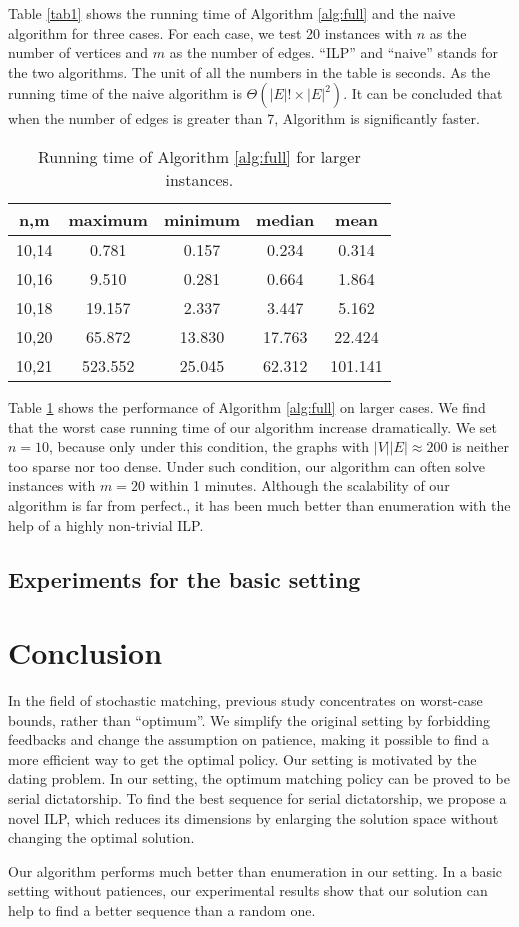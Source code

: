 \documentclass[letterpaper]{article}
\begin{document}
Table \ref{tab1} shows the running time of Algorithm \ref{alg:full} and the naive algorithm for three cases.
For each case, we test 20 instances with $n$ as the number of vertices and $m$ as the number of edges.
``ILP'' and ``naive'' stands for the two algorithms.
The unit of all the numbers in the table is seconds.
As the running time of the naive algorithm is $\Theta(|E|!\times |E|^2)$.
It can be concluded that when the number of edges is greater than 7, Algorithm is significantly faster.

\begin{table}
	\caption{Running time of Algorithm \ref{alg:full} for larger instances.}
	\label{tab2}
	\begin{tabular}{ccccc}
		\hline
		n,m & maximum & minimum & median & mean\\ \hline
		10,14 & 0.781&0.157&0.234&0.314\\
		10,16 & 9.510&0.281&0.664&1.864\\
		10,18 & 19.157&2.337&3.447&5.162\\
		10,20 & 65.872&13.830&17.763&22.424\\
		10,21 & 523.552&25.045&62.312&101.141\\ \hline
	\end{tabular}
\end{table}

Table \ref{tab2} shows the performance of Algorithm \ref{alg:full} on larger cases.
We find that the worst case running time of our algorithm increase dramatically.
We set $n=10$, because only under this condition, the graphs with $|V||E|\approx200$ is neither too sparse nor too dense.
Under such condition, our algorithm can often solve instances with $m=20$ within 1 minutes.
Although the scalability of our algorithm is far from perfect., it has been much better than enumeration with the help of a highly non-trivial ILP.

\subsection{Experiments for the basic setting}

\section{Conclusion}
In the field of stochastic matching, previous study concentrates on worst-case bounds, rather than ``optimum''.
We simplify the original setting by forbidding feedbacks and change the assumption on patience, making it possible to find a more efficient way to get the optimal policy.
Our setting is motivated by the dating problem.
In our setting, the optimum matching policy can be proved to be serial dictatorship.
To find the best sequence for serial dictatorship, we propose a novel ILP, which reduces its dimensions by enlarging the solution space without changing the optimal solution.
 
Our algorithm performs much better than enumeration in our setting.
In a basic setting without patiences, our experimental results show that our solution can help to find a better sequence than a random one. 

\newpage


\end{document}
